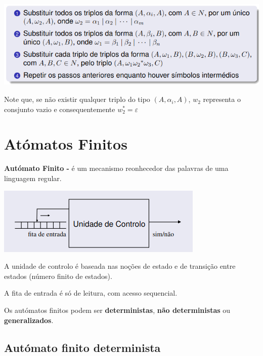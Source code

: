 \documentclass{article}
\begin{document}
\begin{flushleft}
  \begin{center}
    \includegraphics[scale=0.4]{26}
  \end{center}

  \item Note que, se não existir qualquer triplo do tipo $(A, \alpha_i, A)$, $w_2$ representa
  o consjunto vazio e consequentemente $w_2^* = \varepsilon$
\end{flushleft}

\section{Atómatos Finitos}

\begin{flushleft}
  \textbf{Autómato Finito -} é um mecanismo reonhecedor das palavras de uma linguagem regular.
  \vspace{4mm}
  \begin{center}
    \includegraphics[scale=0.5]{28}
  \end{center}
  \item A unidade de controlo é baseada nas noções de estado e de transição entre estados (número finito de estados).
  \item A fita de entrada é só de leitura, com acesso sequencial.
  \item Os autómatos finitos podem ser \textbf{deterministas}, \textbf{não deterministas} ou \textbf{generalizados}.
\end{flushleft}

\break

\subsection{Autómato finito determinista}
\end{document}
